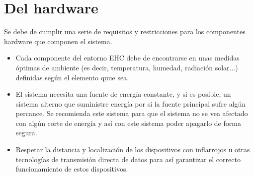 \section{Del hardware}
Se debe de cumplir una serie de requisitos y restricciones para los componentes hardware que componen el sistema.
\begin{itemize}
\item Cada componente del entorno EHC debe de encontrarse en unas medidas óptimas de ambiente (es decir, temperatura, humedad, radiación solar...) definidas seg\'un el elemento quue sea.
\item El sistema necesita una fuente de energía constante, y si es posible, un sistema alterno que suministre energía por si la fuente principal sufre alg\'un percance. Se recomienda este sistema para que el sistema no se vea afectado con alg\'un corte de energía y así con este sistema poder apagarlo de forma segura.
\item Respetar la distancia y localización de los dispositivos con inflarrojos u otras tecnologías de transmisión directa de datos para así garantizar el correcto funcionamiento de estos dispositivos. 
\end{itemize}